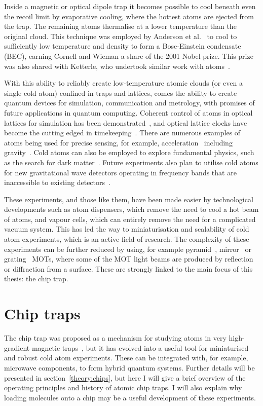 Inside a magnetic or optical dipole trap it becomes possible to cool beneath
even the recoil limit by evaporative cooling, where the hottest atoms are
ejected from the trap. The remaining atoms thermalise at a lower temperature
than the original cloud. This technique was employed by Anderson et
al.~\cite{Anderson198} to cool \esRb{} to sufficiently low temperature and
density to form a Bose-Einstein condensate (BEC), earning Cornell and Wieman a
share of the 2001 Nobel prize. This prize was also shared with Ketterle, who
undertook similar work with \Na{} atoms~\cite{PhysRevLett.75.3969}.

With this ability to reliably create low-temperature atomic clouds (or even a
single cold atom) confined in traps and lattices, comes the ability to create
quantum devices for simulation, communication and metrology, with promises of
future applications in quantum computing. Coherent control of atoms in optical
lattices for simulation has been demonstrated~\cite{Schafer2020}, and optical
lattice clocks have become the cutting edged in
timekeeping~\cite{PhysRevX.8.021036}. There are numerous examples of atoms
being used for precise sensing, for example, acceleration~\cite{Chen2019}
including gravity~\cite{Stray2022}. Cold atoms can also be employed to
explore fundamental physics, such as the search for dark
matter~\cite{Wcislo2018}. Future experiments also plan to utilise cold atoms
for new gravitational wave detectors operating in frequency bands that are
inaccessible to existing detectors~\cite{Badurina_2020}.

These experiments, and those like them, have been made easier by technological
developments such as atom dispensers, which remove the need to cool
a hot beam of atoms, and vapour cells, which can entirely remove the
need for a complicated vacuum system. This has led the way to miniaturisation
and scalability of cold atom experiments, which is an active field of research.
The complexity of these experiments can be further reduced by using, for
example pyramid~\cite{Lee:96}, mirror~\cite{Reichel1999, 4797887} or
grating~\cite{Nshii2013} MOTs, where some of the MOT light beams are produced
by reflection or diffraction from a surface. These are strongly linked to the
main focus of this thesis: the chip trap.

\section{Chip traps}

The chip trap was proposed as a mechanism for studying atoms in very
high-gradient magnetic traps~\cite{PhysRevA.52.4004}, but it has evolved into a
useful tool for miniaturised and robust cold atom experiments. These can be
integrated with, for example, microwave components, to form hybrid quantum
systems. Further details will be presented in section~\ref{theory:chips}, but
here I will give a brief overview of the operating principles and history of
atomic chip traps. I will also explain why loading molecules onto a chip may be
a useful development of these experiments.

